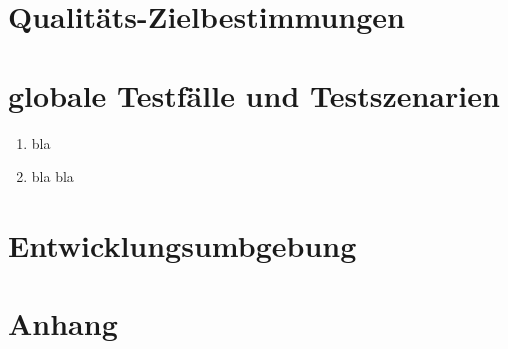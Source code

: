 \documentclass[parskip=full]{scrartcl}
\def\threedigits#1{%
  \ifnum#1<100 0\fi
  \ifnum#1<10 0\fi
  \number#1}
\begin{document}
\newpage
\section{Qualitäts-Zielbestimmungen}

\newpage
\section{globale Testfälle und Testszenarien}

\begin{enumerate}[label={\textbf{/T\protect\threedigits{\theenumi}0/}}, leftmargin=*]
	\item bla
	\item bla bla
\end{enumerate}

\newpage
\section{Entwicklungsumbgebung}

\newpage
\section{Anhang}

\newpage
\printglossary	
\end{document}
